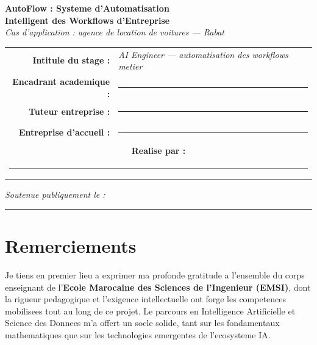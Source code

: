 \documentclass[12pt,a4paper,openany]{report}
\begin{document}
\begin{titlepage}
\begin{center}
\vspace{1cm}

{\Huge\bfseries\color{titleBlue}
  AutoFlow : Systeme d'Automatisation\\[0.3cm]
  Intelligent des Workflows d'Entreprise}\\[0.4cm]

{\normalsize\itshape\color{titleBlue!80} Cas d'application : agence de location de voitures --- Rabat}

\vspace{0.8cm}

\begin{minipage}{0.72\textwidth}\centering
\begin{tabular}{rl}
\textbf{Intitule du stage :} & \textit{AI Engineer --- automatisation des workflows metier} \\[0.4cm]
\textbf{Encadrant academique :} & \rule{5cm}{0.4pt} \\[0.3cm]
\textbf{Tuteur entreprise :}    & \rule{5cm}{0.4pt} \\[0.3cm]
\textbf{Entreprise d'accueil :} & \rule{5cm}{0.4pt} \\[0.6cm]
\multicolumn{2}{c}{\textbf{Realise par :}} \\[0.3cm]
\multicolumn{2}{c}{\rule{6cm}{0.4pt}} \\
\end{tabular}
\end{minipage}

\vspace{0.4cm}
\begin{center}
{\small\color{gray!100}
\textit{Soutenue publiquement le :} \rule{3cm}{0.4pt}}
\end{center}

\vfill
\end{center}
\end{titlepage}

\chapter*{Remerciements}
\thispagestyle{plain}

Je tiens en premier lieu a exprimer ma profonde gratitude a l'ensemble du corps enseignant de l'\textbf{Ecole Marocaine des Sciences de l'Ingenieur (EMSI)}, dont la rigueur pedagogique et l'exigence intellectuelle ont forge les competences mobilisees tout au long de ce projet. Le parcours en Intelligence Artificielle et Science des Donnees m'a offert un socle solide, tant sur les fondamentaux mathematiques que sur les technologies emergentes de l'ecosysteme IA.
\end{document}
